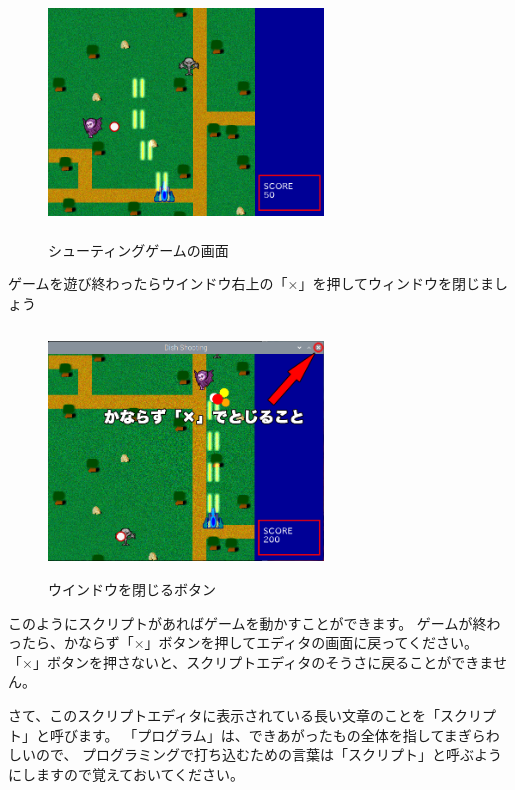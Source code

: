 \begin{figure}[H]
  \begin{center}
    \includegraphics[keepaspectratio,width=7.31cm,height=6.562cm]{images/chap02/s_shoot.png}
    \caption{シューティングゲームの画面}
  \end{center}
  \label{fig:hsp_shoot}
\end{figure}

ゲームを遊び終わったらウインドウ右上の「×」を押してウィンドウを閉じましょう

\begin{figure}[H]
  \begin{center}
    \includegraphics[keepaspectratio,width=7.31cm,height=6.562cm]{images/chap02/s_shoot2.png}
    \caption{ウインドウを閉じるボタン}
  \end{center}
  \label{fig:hsp_shoot2}
\end{figure}

このようにスクリプトがあればゲームを動かすことができます。
ゲームが終わったら、かならず「×」ボタンを押してエディタの画面に戻ってください。
「×」ボタンを押さないと、スクリプトエディタのそうさに戻ることができません。

さて、このスクリプトエディタに表示されている長い文章のことを「スクリプト」と呼びます。
「プログラム」は、できあがったもの全体を指してまぎらわしいので、
プログラミングで打ち込むための言葉は「スクリプト」と呼ぶようにしますので覚えておいてください。

